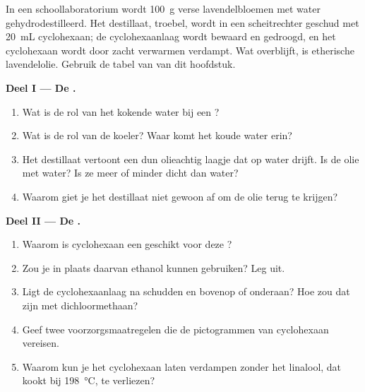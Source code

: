 \begin{problem}
\label{pb:g10:chemical-species:1}
In een schoollaboratorium wordt \qty{100}{g} verse lavendelbloemen met
water gehydrodestilleerd. Het destillaat, troebel, wordt in een
scheitrechter geschud met \qty{20}{mL} cyclohexaan; de cyclohexaanlaag
wordt bewaard en gedroogd, en het cyclohexaan wordt door zacht verwarmen
verdampt. Wat overblijft, is etherische lavendelolie. Gebruik de tabel
van  van dit hoofdstuk.

\medskip
\noindent\textbf{Deel I --- De .}
\begin{enumerate}
  \item Wat is de rol van het kokende water bij een ?
  \item Wat is de rol van de koeler? Waar komt het koude water erin?
  \item Het destillaat vertoont een dun olieachtig laagje dat op water
        drijft. Is de olie  met water? Is ze meer of minder dicht
        dan water?
  \item Waarom giet je het destillaat niet gewoon af om de olie terug te
        krijgen?
\end{enumerate}

\medskip
\noindent\textbf{Deel II --- De .}
\begin{enumerate}[resume]
  \item Waarom is cyclohexaan een geschikt  voor deze
        ?
  \item Zou je in plaats daarvan ethanol kunnen gebruiken? Leg uit.
  \item Ligt de cyclohexaanlaag na schudden en  bovenop of
        onderaan? Hoe zou dat zijn met dichloormethaan?
  \item Geef twee voorzorgsmaatregelen die de pictogrammen van
        cyclohexaan vereisen.
  \item Waarom kun je het cyclohexaan laten verdampen zonder het linalool,
        dat kookt bij \qty{198}{\celsius}, te verliezen?
\end{enumerate}


\end{problem}
